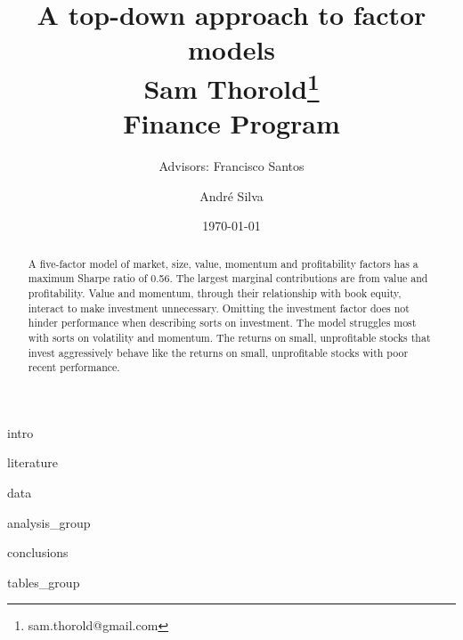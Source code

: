 \documentclass[a4paper, 12pt]{article}
\title{
  {A top-down approach to factor models}\\[1cm]
  {\Large Sam Thorold\thanks{sam.thorold@gmail.com}}\\
  {\large Finance Program}\\
}
\author[1]{Advisors: Francisco Santos}
\affil[1]{Norwegian School of Economics}
\author[2]{Andr\'e Silva}
\affil[2]{NOVA School of Business and Economics}
\date{\today}
\begin{document}
\maketitle



\begin{abstract}
  A five-factor model of
  market, size, value, momentum and profitability factors
  has a maximum Sharpe ratio of 0.56.
  The largest marginal contributions are from value and profitability.
  Value and momentum, through their relationship with book equity,
  interact to make investment unnecessary.
  Omitting the investment factor does not hinder performance when describing
  sorts on investment.
  The model struggles most with sorts on volatility and momentum.
  The returns on small, unprofitable stocks that invest aggressively behave
  like the returns on small, unprofitable stocks with poor recent performance.
\end{abstract}

{intro}

{literature}

{data}

{analysis_group}

{conclusions}


\printbibliography

\appendix

{tables_group}

\end{document}
